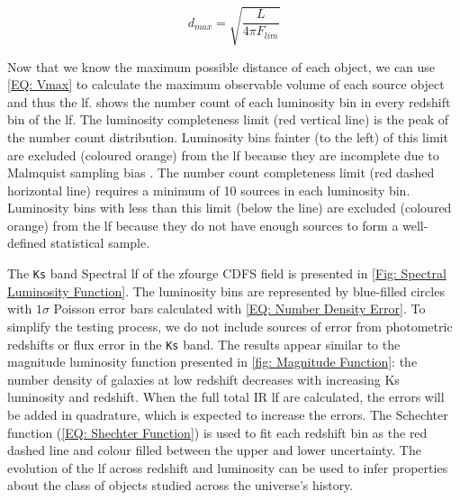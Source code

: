 \begin{equation}
    d_{max} = \sqrt{\frac{L}{4 \pi F_{lim}}}
    \label{EQ: Maximum Luminosity Distance}
\end{equation}

Now that we know the maximum possible distance of each object, we can use \cref{EQ: Vmax} to calculate the maximum observable volume of each source object and thus the \gls{lf}.  shows the number count of each luminosity bin in every redshift bin of the \gls{lf}. The luminosity completeness limit (red vertical line) is the peak of the number count distribution. Luminosity bins fainter (to the left) of this limit are excluded (coloured orange) from the \gls{lf} because they are incomplete due to Malmquist sampling bias \citep{malmquist_relations_1922}. The number count completeness limit (red dashed horizontal line) requires a minimum of 10 sources in each luminosity bin. Luminosity bins with less than this limit (below the line) are excluded (coloured orange) from the \gls{lf} because they do not have enough sources to form a well-defined statistical sample. 

The \texttt{Ks} band Spectral \gls{lf} of the \gls{zfourge} CDFS field is presented in \cref{Fig: Spectral Luminosity Function}. The luminosity bins are represented by blue-filled circles with $1\sigma$ Poisson error bars calculated with \cref{EQ: Number Density Error}. To simplify the testing process, we do not include sources of error from photometric redshifts or flux error in the \texttt{Ks} band. The results appear similar to the magnitude luminosity function presented in \cref{fig: Magnitude Function}: the number density of galaxies at low redshift decreases with increasing Ks luminosity and redshift. When the full total IR \gls{lf} are calculated, the errors will be added in quadrature, which is expected to increase the errors. The Schechter function (\cref{EQ: Shechter Function}) is used to fit each redshift bin as the red dashed line and colour filled between the upper and lower uncertainty. The evolution of the \gls{lf} across redshift and luminosity can be used to infer properties about the class of objects studied across the universe's history.